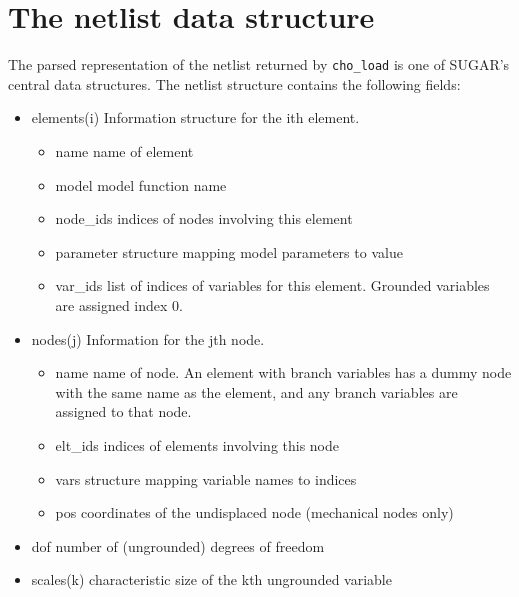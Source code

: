 
\section{The netlist data structure}

The parsed representation of the netlist returned by 
\texttt{cho\_load} is one of SUGAR's central data structures. 
The netlist structure contains the following fields:

\begin{itemize}

\item{elements(i)} Information structure for the ith element.
\begin{itemize}
     \item{name} name of element
     \item{model} model function name
     \item{node\_ids} indices of nodes involving this element
     \item{parameter} structure mapping model parameters to value
     \item{var\_ids} list of indices of variables for this element. 
                     Grounded variables are assigned index 0.
\end{itemize}

\item{nodes(j)} Information for the jth node.
\begin{itemize}
     \item{name} name of node. An element with branch variables has a dummy
           node with the same name as the element, and any branch variables
           are assigned to that node.
     \item{elt\_ids} indices of elements involving this node
     \item{vars} structure mapping variable names to indices
     \item{pos} coordinates of the undisplaced node (mechanical nodes only)
\end{itemize}

\item{dof} number of (ungrounded) degrees of freedom

\item{scales(k)} characteristic size of the kth ungrounded variable

\end{itemize}

